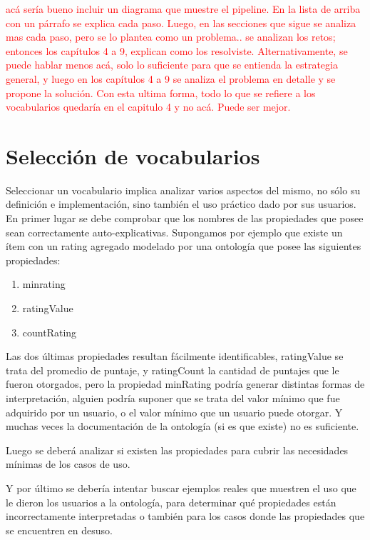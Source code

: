 \begin{framed}
\textcolor{red}{acá sería bueno incluir un diagrama que muestre el pipeline. En la lista de arriba con un párrafo se explica cada paso. Luego, en las secciones que sigue se analiza mas cada paso, pero se lo plantea como un problema.. se analizan los retos; entonces los capítulos 4 a 9, explican como los resolviste. Alternativamente, se puede hablar menos acá, solo lo suficiente para que se entienda la estrategia general, y luego en los capítulos 4 a 9 se analiza el problema en detalle y se propone la solución. Con esta ultima forma, todo lo que se refiere a los vocabularios quedaría en el capitulo 4 y no acá. Puede ser mejor.}
\end{framed}


\section{Selección de vocabularios}

Seleccionar un vocabulario implica analizar varios aspectos del mismo, no sólo su definición e implementación, sino también el uso práctico dado por sus usuarios. 
En primer lugar se debe comprobar que los nombres de las propiedades que posee sean correctamente auto-explicativas. Supongamos por ejemplo que existe un ítem con un rating agregado modelado por una ontología que posee las siguientes propiedades:

\begin{enumerate}
\item minrating
\item ratingValue
\item countRating
\end{enumerate}


Las dos últimas propiedades resultan fácilmente identificables, ratingValue se trata del promedio de puntaje, y ratingCount 
la cantidad de puntajes que le fueron otorgados, pero la propiedad minRating podría generar distintas formas de interpretación, 
alguien podría suponer que se trata del valor mínimo que fue adquirido por un usuario, o el valor mínimo que un usuario puede 
otorgar. Y muchas veces la documentación de la ontología (si es que existe) no es suficiente.

Luego se deberá analizar si existen las propiedades para cubrir las necesidades mínimas de los casos de uso.

Y por último se debería intentar buscar ejemplos reales que muestren el uso que le dieron los usuarios a la ontología, para 
determinar qué propiedades están incorrectamente interpretadas o también para los casos donde las propiedades que se encuentren 
en desuso.

